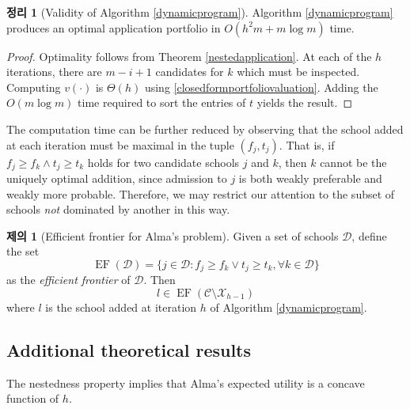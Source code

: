 \documentclass[12pt]{article} %
\newtheorem{theorem}{Theorem}
\theoremstyle{definition}
\newtheorem{proposition}{Proposition}
\newtheorem{theorem}{정리}
\theoremstyle{definition}
\newtheorem{proposition}{제의}
\begin{document}
\begin{theorem}[Validity of Algorithm \ref{dynamicprogram}]
Algorithm \ref{dynamicprogram} produces an optimal application portfolio in $O(h^2 m + m \log m)$ time.
\end{theorem}
\begin{proof}
Optimality follows from Theorem \ref{nestedapplication}. At each of the $h$ iterations, there are $m - i +1$ candidates for $k$ which must be inspected. Computing $v(\cdot)$ is $\Theta(h)$ using \eqref{closedformportfoliovaluation}. Adding the $O(m\log m)$ time required to sort the entries of $t$ yields the result.
\end{proof}

The computation time can be further reduced by observing that the school added at each iteration must be maximal in the tuple $(f_j, t_j)$. That is, if $f_j \geq f_k \wedge t_j \geq t_k$ holds for two candidate schools $j$ and $k$, then $k$ cannot be the uniquely optimal addition, since admission to $j$ is both weakly preferable and weakly more probable. Therefore, we may restrict our attention to the subset of schools \emph{not} dominated by another in this way.
\begin{proposition}[Efficient frontier for Alma's problem]
Given a set of schools $\mathcal{D}$, define the set
\begin{equation}
\operatorname{EF}(\mathcal{D})  = \{j \in \mathcal{D}: f_j \geq f_k \vee t_j \geq t_k, \forall k \in \mathcal{D}\}
\end{equation}
as the \emph{efficient frontier} of $\mathcal{D}$. Then
\begin{equation} l \in \operatorname{EF}(\mathcal{C}\setminus  \mathcal{X}_{h-1}) \end{equation}
where $l$ is the school added at iteration $h$ of Algorithm \ref{dynamicprogram}.
\end{proposition}

\subsection{Additional theoretical results}
The nestedness property implies that Alma's expected utility is a concave function of $h$.
\end{document}

